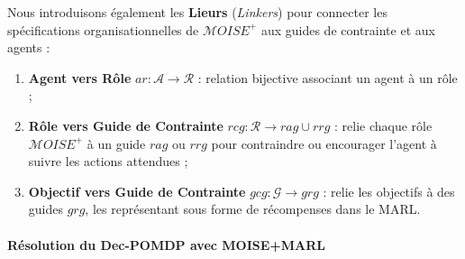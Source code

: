 \vspace{0.8em}

\noindent Nous introduisons également les \textbf{Lieurs} (\textit{Linkers}) pour connecter les spécifications organisationnelles de $\mathcal{M}OISE^+$ aux guides de contrainte et aux agents :

\begin{enumerate}[label={\roman*) },itemjoin={; \quad}]
    \item \textbf{Agent vers Rôle} \quad $ar: \mathcal{A} \to \mathcal{R}$ : relation bijective associant un agent à un rôle ;
    
    \item \textbf{Rôle vers Guide de Contrainte} \quad $rcg: \mathcal{R} \rightarrow rag \cup rrg$ : relie chaque rôle $\mathcal{M}OISE^+$ à un guide $rag$ ou $rrg$ pour contraindre ou encourager l'agent à suivre les actions attendues ;
    
    \item \textbf{Objectif vers Guide de Contrainte} \quad $gcg: \mathcal{G} \rightarrow grg$ : relie les objectifs à des guides $grg$, les représentant sous forme de récompenses dans le MARL.
\end{enumerate}

\paragraph{\textbf{Résolution du Dec-POMDP avec MOISE+MARL}}

